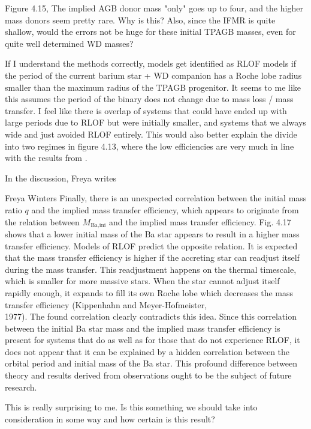\documentclass[a4paper,10pt]{article}
\begin{document}
\begin{enumd}
\item Figure 4.15, The implied AGB donor mass "only" goes up to four, and the higher mass donors seem pretty rare. Why is this?  Also, since the IFMR is quite shallow, would the errors not be huge for these initial TPAGB masses, even for quite well determined WD masses?
    \item  If I understand the methods correctly, models get identified as RLOF models if the period of the current barium star + WD companion has a Roche lobe radius smaller than the maximum radius of the TPAGB progenitor. It seems to me like this assumes the period of the binary does not change due to mass loss / mass transfer. I feel like there is overlap of systems that could have ended up with large periods due to RLOF but were initially smaller, and systems that we always wide and just avoided RLOF entirely. This would also better explain the divide into two regimes in figure 4.13, where the low efficiencies are very much in line with the results from \citet{saladino2019}.
    \item  In the discussion, Freya writes
\begin{shadequote}[l]{Freya Winters}
Finally, there is an unexpected correlation between the initial mass ratio \(q\) and the implied mass
transfer efficiency, which appears to originate from the relation between \(M_\text{Ba,ini}\) and the implied
mass transfer efficiency. Fig. 4.17 shows that a lower initial mass of the Ba star appears to result in a
higher mass transfer efficiency. Models of RLOF predict the opposite relation. It is expected that the
mass transfer efficiency is higher if the accreting star can readjust itself during the mass transfer.
This readjustment happens on the thermal timescale, which is smaller for more massive stars. When
the star cannot adjust itself rapidly enough, it expands to fill its own Roche lobe which decreases the
mass transfer efficiency (Kippenhahn and Meyer-Hofmeister,\\1977). The found correlation clearly
contradicts this idea. Since this correlation between the initial Ba star mass and the implied mass
transfer efficiency is present for systems that do as well as for those that do not experience RLOF,
it does not appear that it can be explained by a hidden correlation between the orbital period
and initial mass of the Ba star. This profound difference between theory and results derived from
observations ought to be the subject of future research.
\end{shadequote}
This is really surprising to me. Is this something we should take into consideration in some way and how certain is this result?
\end{enumd}
\end{document}
